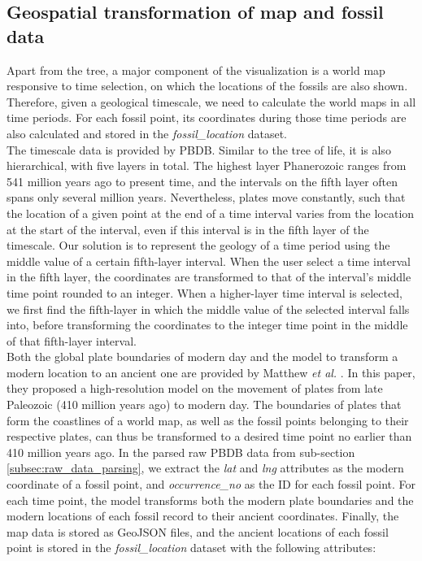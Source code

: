 \documentclass[11pt, a4paper,oneside,chapterprefix=false]{scrbook}
\begin{document}
\subsection{Geospatial transformation of map and fossil data} \label{subsec:geospatial_transformation}
Apart from the tree, a major component of the visualization is a world map responsive to time selection, on which the locations of the fossils are also shown. Therefore, given a geological timescale, we need to calculate the world maps in all time periods. For each fossil point, its coordinates during those time periods are also calculated and stored in the \emph{fossil\_location} dataset. \\

The timescale data is provided by PBDB. Similar to the tree of life, it is also hierarchical, with five layers in total. The highest layer Phanerozoic ranges from 541 million years ago to present time, and the intervals on the fifth layer often spans only several million years. Nevertheless, plates move constantly, such that the location of a given point at the end of a time interval varies from the location at the start of the interval, even if this interval is in the fifth layer of the timescale.  Our solution is to represent the geology of a time period using the middle value of a certain fifth-layer interval. When the user select a time interval in the fifth layer, the coordinates are transformed to that of the interval's middle time point rounded to an integer. When a higher-layer time interval is selected, we first find the fifth-layer in which the middle value of the selected interval falls into, before transforming the coordinates to the integer time point in the middle of that fifth-layer interval. \\

Both the global plate boundaries of modern day and the model to transform a modern location to an ancient one are provided by Matthew \emph{et al.} \cite{matthews2016global}. In this paper, they proposed a high-resolution model on the movement of plates from late Paleozoic (410 million years ago) to modern day. The boundaries of plates that form the coastlines of a world map, as well as the fossil points belonging to their respective plates, can thus be transformed to a desired time point no earlier than 410 million years ago. In the parsed raw PBDB data from sub-section \ref{subsec:raw_data_parsing}, we extract the \emph{lat} and \emph{lng} attributes as the modern coordinate of a fossil point, and \emph{occurrence\_no} as the ID for each fossil point. For each time point, the model transforms both the modern plate boundaries and the modern locations of each fossil record to their ancient coordinates. Finally, the map data is stored as GeoJSON files, and the ancient locations of each fossil point is stored in the \emph{fossil\_location} dataset with the following attributes: \\
\end{document}

